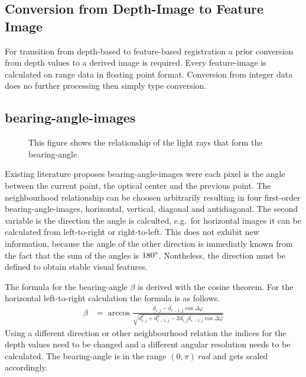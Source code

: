 \subsection{Conversion from Depth-Image to Feature Image}

For transition from depth-based to feature-based registration a prior conversion from depth values to a derived image is required.
Every feature-image is calculated on range data in floating point format.
Conversion from integer data does no further processing then simply type conversion.

\subsection{\Glspl{bearing-angle-image}}

\begin{figure}[H]
    \centering
    \caption[Schematic Representation of Bearing-Angles]{This figure shows the relationship of the light rays that form the \gls{bearing-angle}.}
\end{figure}

Existing literature\cite{Scaramuzza2007,Lin2017} proposes \Glspl{bearing-angle-image} were each pixel is the angle between the current point, the optical center and the previous point.
The neighbourhood relationship can be choosen arbitrarily resulting in four first-order \Glspl{bearing-angle-image}, horizontal, vertical, diagonal and antidiagonal.
The second variable is the direction the angle is calculted, e.g.~for horizontal images it can be calculated from left-to-right or right-to-left.
This does not exhibit new information, because the angle of the other direction is immediatly known from the fact that the sum of the angles is $180\degree$.
Nontheless, the direction must be defined to obtain stable visual features.

The formula for the \gls{bearing-angle} $\beta$ is derived with the cosine theorem.
For the horizontal left-to-right calculation the formula is as follows.
\begin{align}
    \beta&= \arccos%
            \frac{d_{i,j} - d_{i-1,j} \cos \Delta\varphi}%
                 {\sqrt{d_{i,j}^2 + d_{i-1,j}^2 - 2 d_{i,j} d_{i-1,j} \cos \Delta\varphi}}
\end{align}
Using a different direction or other neighbourhood relation the indices for the depth values need to be changed and a different angular resolution needs to be calculated.
The \Gls{bearing-angle} is in the range $(0, \pi)~rad$ and gets scaled accordingly.

